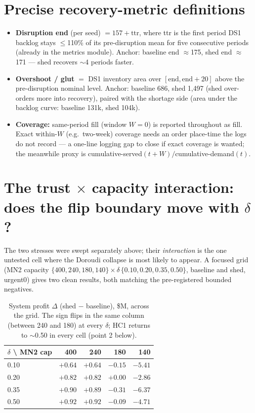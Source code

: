 \documentclass[11pt]{article}
\begin{document}
\section{Precise recovery-metric definitions}

\begin{itemize}\setlength\itemsep{1pt}
\item \textbf{Disruption end} (per seed) $= 157 + \mathrm{ttr}$, where ttr is the first period
DS1 backlog stays $\le$110\% of its pre-disruption mean for five consecutive periods (already
in the metrics module). Anchor: baseline end $\approx$175, shed end $\approx$171 --- shed
recovers $\sim$4 periods faster.
\item \textbf{Overshoot / glut} $=$ DS1 inventory area over $[\text{end},\text{end}+20]$ above
the pre-disruption nominal level. Anchor: baseline 686, shed 1{,}497 (shed over-orders more
into recovery), paired with the shortage side (area under the backlog curve: baseline 131k,
shed 104k).
\item \textbf{Coverage:} same-period fill (window $W=0$) is reported throughout as fill. Exact
within-$W$ (e.g.\ two-week) coverage needs an order place-time the logs do not record --- a
one-line logging gap to close if exact coverage is wanted; the meanwhile proxy is
cumulative-served$(t+W)/$cumulative-demand$(t)$.
\end{itemize}

\section{The trust $\times$ capacity interaction: does the flip boundary move with $\delta$?}

The two stresses were swept separately above; their \emph{interaction} is the one untested cell
where the Doroudi collapse is most likely to appear. A focused grid (MN2 capacity
$\{400,240,180,140\}\times\delta\,\{0.10,0.20,0.35,0.50\}$, baseline and shed, urgent0) gives
two clean results, both matching the pre-registered bounded negatives.

\begin{table}[h]
\centering\small
\caption{System profit $\Delta$ (shed $-$ baseline), \$M, across the grid. The sign flips in the
same column (between 240 and 180) at every $\delta$; HC1 returns to $\sim$0.50 in every cell
(point 2 below).}
\label{tab:grid}
\begin{tabular}{l r r r r}
\toprule
$\delta$ \textbackslash{} MN2 cap & 400 & 240 & 180 & 140 \\
\midrule
0.10 & $+0.64$ & $+0.64$ & $\mathbf{-0.15}$ & $\mathbf{-5.41}$ \\
0.20 & $+0.82$ & $+0.82$ & $\mathbf{+0.00}$ & $\mathbf{-2.86}$ \\
0.35 & $+0.90$ & $+0.89$ & $\mathbf{-0.31}$ & $\mathbf{-6.37}$ \\
0.50 & $+0.92$ & $+0.92$ & $\mathbf{-0.09}$ & $\mathbf{-4.71}$ \\
\bottomrule
\end{tabular}
\end{table}
\end{document}
